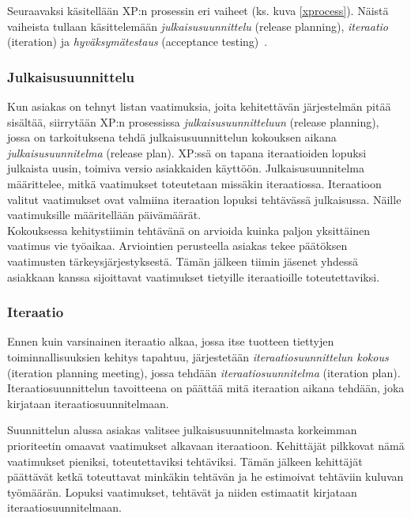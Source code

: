 \documentclass[finnish]{../tktltiki2}
\theoremstyle{definition}
\theoremstyle{remark}
\begin{document}
Seuraavaksi käsitellään XP:n prosessin eri vaiheet (ks. kuva \ref{xprocess}). Näistä vaiheista tullaan käsittelemään \emph{julkaisusuunnittelu} (release planning), \emph{iteraatio} (iteration) ja \emph{hyväksymätestaus} (acceptance testing)~\cite{XP.ORG}.

\subsubsection{Julkaisusuunnittelu}

Kun asiakas on tehnyt listan vaatimuksia, joita kehitettävän järjestelmän pitää sisältää, siirrytään XP:n prosessissa \emph{julkaisusuunnitteluun} (release planning),
jossa on tarkoituksena tehdä julkaisusuunnittelun kokouksen aikana \emph{julkaisusuunnitelma} (release plan). XP:ssä on tapana iteraatioiden lopuksi julkaista uusin, toimiva versio asiakkaiden käyttöön. Julkaisusuunnitelma määrittelee, mitkä vaatimukset toteutetaan missäkin iteraatiossa. Iteraatioon valitut vaatimukset ovat valmiina iteraation lopuksi tehtävässä julkaisussa. Näille vaatimuksille määritellään päivämäärät.\\

Kokouksessa kehitystiimin tehtävänä on arvioida kuinka paljon yksittäinen vaatimus vie työaikaa. Arviointien perusteella asiakas
tekee päätök\-sen vaatimusten tärkeysjärjestyksestä. Tämän jälkeen tiimin jäsenet
yhdessä asiakkaan kanssa sijoittavat vaatimukset tietyille iteraatioille toteutettaviksi.

\subsubsection{Iteraatio}

Ennen kuin varsinainen iteraatio alkaa, jossa itse tuotteen tiettyjen toiminnallisuuksien
kehitys tapahtuu, järjestetään \emph{iteraatiosuunnittelun kokous} (iteration planning meeting), jossa tehdään \emph{iteraatiosuunnitelma} (iteration plan). Iteraatiosuunnittelun tavoitteena on päättää mitä iteraation aikana tehdään, joka kirjataan iteraatiosuunnitelmaan.

Suunnittelun alussa asiakas valitsee julkaisusuunnitelmasta korkeimman prioriteetin omaavat vaatimukset alkavaan iteraatioon. Kehittäjät pilkkovat nämä vaatimukset pieniksi, toteutettaviksi tehtäviksi. Tämän jälkeen kehittäjät päättävät ketkä toteuttavat minkäkin tehtävän ja he estimoivat tehtäviin kuluvan työmäärän. Lopuksi vaatimukset, tehtävät ja niiden estimaatit kirjataan iteraatiosuunnitelmaan.\\
\end{document}
